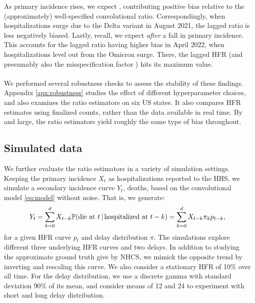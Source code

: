 \documentclass{article}
\newcommand{\given}{\, \vert \,}
\begin{document}
As primary incidence rises, we expect , contributing
positive bias relative to the (approximately) well-specified convolutional
ratio. Correspondingly, when hospitalizations surge due to the Delta variant in 
August 2021, the lagged ratio is less negatively biased. Lastly, recall, we
expect  \emph{after} a fall in primary incidence. This
accounts for the lagged ratio having higher bias in April 2022, when
hospitalizations level out from the Omicron surge. There, the lagged HFR (and 
presumably also the misspecification factor ) hits its maximum
value.   

\paragraph{}

We performed several robustness checks to assess the stability of these
findings. Appendix \ref{apx:robustness} studies the effect of different
hyperparameter choices, and also examines the ratio estimators on six US
states. It also compares HFR estimates using finalized counts, rather than the
data available in real time. By and large, the ratio estimators yield roughly
the same type of bias throughout.

\subsection{Simulated data}
\label{sec:results_sim}

We further evaluate the ratio estimators in a variety of simulation settings. 
Keeping the primary incidence $X_t$ as hospitalizations reported to the HHS, we
simulate a secondary incidence curve $Y_t$, deaths, based on the convolutional
model \eqref{eq:model} without noise. That is, we generate:
\[
Y_t = \sum_{k=0}^d X_{t-k} \P(\text{die at $t$} \given \text{hospitalized at
  $t-k$}) = \sum_{k=0}^d X_{t-k} \pi_k p_{t-k},
\]
for a given HFR curve $p_t$ and delay distribution $\pi$. The simulations
explore different three underlying HFR curves and two delays. In addition to
studying the approximate ground truth give by NHCS, we mimick the opposite trend
by inverting and rescaling this curve. We also consider a stationary HFR of
10\% over all time. For the delay distribution, we use a discrete gamma with
standard deviation 90\% of its mean, and consider means of 12 and 24 to
experiment with short and long delay distribution.      
\end{document}
